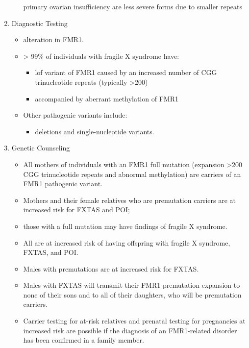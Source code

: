 \documentclass{scrartcl}
\begin{document}
\begin{enumerate}
\begin{itemize}
primary ovarian insufficiency are less severe forms due to smaller
repeats
\end{itemize}
\item Diagnostic Testing
\label{sec:org9b31cb0}
\begin{itemize}
\item alteration in FMR1.
\item \textgreater{} 99\% of individuals with fragile X syndrome have:
\begin{itemize}
\item lof variant of FMR1 caused by an increased number of CGG
trinucleotide repeats (typically >200)
\item accompanied by aberrant methylation of FMR1
\end{itemize}
\item Other pathogenic variants include:
\begin{itemize}
\item deletions and single-nucleotide variants.
\end{itemize}
\end{itemize}
\item Genetic Counseling
\label{sec:org5b90e59}
\begin{itemize}
\item All mothers of individuals with an FMR1 full mutation (expansion
>200 CGG trinucleotide repeats and abnormal methylation) are
carriers of an FMR1 pathogenic variant.
\item Mothers and their female relatives who are premutation carriers are
at increased risk for FXTAS and POI;
\item those with a full mutation may have findings of fragile X syndrome.
\item All are at increased risk of having offspring with fragile X syndrome, FXTAS, and POI.
\item Males with premutations are at increased risk for FXTAS.
\item Males with FXTAS will transmit their FMR1 premutation expansion to none of their sons and to all of their daughters, who will be premutation carriers.
\item Carrier testing for at-risk relatives and prenatal testing for
pregnancies at increased risk are possible if the diagnosis of an
FMR1-related disorder has been confirmed in a family member.
\end{itemize}
\end{enumerate}
\end{document}
